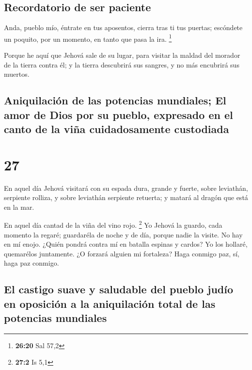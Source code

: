 \hypertarget{recordatorio-de-ser-paciente}{%
\subsection{Recordatorio de ser
paciente}\label{recordatorio-de-ser-paciente}}

 Anda, pueblo mío, éntrate en tus aposentos, cierra tras ti
tus puertas; escóndete un poquito, por un momento, en tanto que pasa la
ira. \footnote{\textbf{26:20} Sal 57,2}

 Porque he aquí que Jehová sale de su lugar, para visitar
la maldad del morador de la tierra contra él; y la tierra descubrirá sus
sangres, y no más encubrirá sus muertos.

\hypertarget{aniquilaciuxf3n-de-las-potencias-mundiales-el-amor-de-dios-por-su-pueblo-expresado-en-el-canto-de-la-viuxf1a-cuidadosamente-custodiada}{%
\subsection{Aniquilación de las potencias mundiales; El amor de Dios por
su pueblo, expresado en el canto de la viña cuidadosamente
custodiada}\label{aniquilaciuxf3n-de-las-potencias-mundiales-el-amor-de-dios-por-su-pueblo-expresado-en-el-canto-de-la-viuxf1a-cuidadosamente-custodiada}}

\hypertarget{section-26}{%
\section{27}\label{section-26}}

 En aquel día Jehová visitará con su espada dura, grande y
fuerte, sobre leviathán, serpiente rolliza, y sobre leviathán serpiente
retuerta; y matará al dragón que está en la mar.

 En aquel día cantad de la viña del vino rojo. \footnote{\textbf{27:2}
  Is 5,1}  Yo Jehová la guardo, cada momento la regaré;
guardaréla de noche y de día, porque nadie la visite.  No
hay en mí enojo. ¿Quién pondrá contra mí en batalla espinas y cardos? Yo
los hollaré, quemarélos juntamente.  ¿O forzará alguien mi
fortaleza? Haga conmigo paz, sí, haga paz conmigo.

\hypertarget{el-castigo-suave-y-saludable-del-pueblo-juduxedo-en-oposiciuxf3n-a-la-aniquilaciuxf3n-total-de-las-potencias-mundiales}{%
\subsection{El castigo suave y saludable del pueblo judío en oposición a
la aniquilación total de las potencias
mundiales}\label{el-castigo-suave-y-saludable-del-pueblo-juduxedo-en-oposiciuxf3n-a-la-aniquilaciuxf3n-total-de-las-potencias-mundiales}}

